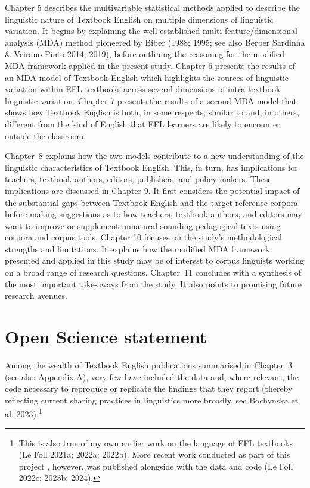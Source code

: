 \documentclass[
  letterpaper,
  DIV=11,
  numbers=noendperiod]{scrreprt}
\begin{document}
Chapter 5 describes the multivariable statistical methods applied to
describe the linguistic nature of Textbook English on multiple
dimensions of linguistic variation. It begins by explaining the
well-established multi-feature/dimensional analysis (MDA) method
pioneered by Biber (1988; 1995; see also Berber Sardinha \& Veirano
Pinto 2014; 2019), before outlining the reasoning for the modified MDA
framework applied in the present study. Chapter 6 presents the results
of an MDA model of Textbook English which highlights the sources of
linguistic variation within EFL textbooks across several dimensions of
intra-textbook linguistic variation. Chapter 7 presents the results of a
second MDA model that shows how Textbook English is both, in some
respects, similar to and, in others, different from the kind of English
that EFL learners are likely to encounter outside the classroom.

Chapter~8 explains how the two models contribute to a new understanding
of the linguistic characteristics of Textbook English. This, in turn,
has implications for teachers, textbook authors, editors, publishers,
and policy-makers. These implications are discussed in Chapter 9. It
first considers the potential impact of the substantial gaps between
Textbook English and the target reference corpora before making
suggestions as to how teachers, textbook authors, and editors may want
to improve or supplement unnatural‑sounding pedagogical texts using
corpora and corpus tools. Chapter 10 focuses on the study's
methodological strengths and limitations. It explains how the modified
MDA framework presented and applied in this study may be of interest to
corpus linguists working on a broad range of research questions.
Chapter~11 concludes with a synthesis of the most important take-aways
from the study. It also points to promising future research avenues.


\chapter{Open Science statement}\label{open-science-statement}

Among the wealth of Textbook English publications summarised in
Chapter~3 (see also
\href{https://elenlefoll.github.io/TextbookMDA/AppendixA.html}{Appendix
A}), very few have included the data and, where relevant, the code
necessary to reproduce or replicate the findings that they report
(thereby reflecting current sharing practices in linguistics more
broadly, see Bochynska et al. 2023).\footnote{This is also true of my
  own earlier work on the language of EFL textbooks (Le Foll 2021a;
  2022a; 2022b). More recent work conducted as part of this project ,
  however, was published alongside with the data and code (Le Foll
  2022c; 2023b; 2024).}
\end{document}
